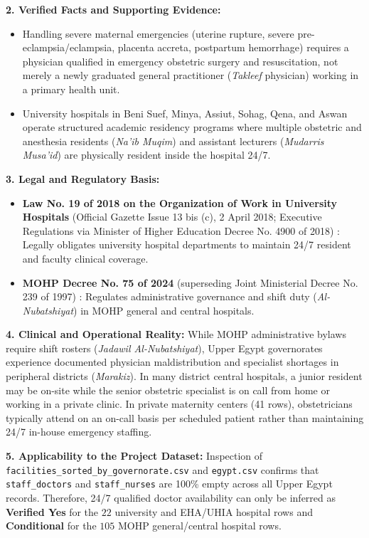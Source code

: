 \documentclass[10pt,a4paper]{article}
\begin{document}
\textbf{2. Verified Facts and Supporting Evidence:}
\begin{itemize}
    \item Handling severe maternal emergencies (uterine rupture, severe pre-eclampsia/eclampsia, placenta accreta, postpartum hemorrhage) requires a physician qualified in emergency obstetric surgery and resuscitation, not merely a newly graduated general practitioner (\textit{Takleef} physician) working in a primary health unit.
    \item University hospitals in Beni Suef, Minya, Assiut, Sohag, Qena, and Aswan operate structured academic residency programs where multiple obstetric and anesthesia residents (\textit{Na'ib Muqim}) and assistant lecturers (\textit{Mudarris Musa'id}) are physically resident inside the hospital 24/7.
\end{itemize}

\textbf{3. Legal and Regulatory Basis:}
\begin{itemize}
    \item \textbf{Law No. 19 of 2018 on the Organization of Work in University Hospitals} (Official Gazette Issue 13 bis (c), 2 April 2018; Executive Regulations via Minister of Higher Education Decree No. 4900 of 2018) \cite{egypt_law_19_2018_univ}: Legally obligates university hospital departments to maintain 24/7 resident and faculty clinical coverage.
    \item \textbf{MOHP Decree No. 75 of 2024} (superseding Joint Ministerial Decree No. 239 of 1997) \cite{egypt_mohp_decree_75_2024}: Regulates administrative governance and shift duty (\textit{Al-Nubatshiyat}) in MOHP general and central hospitals.
\end{itemize}

\textbf{4. Clinical and Operational Reality:}
While MOHP administrative bylaws require shift rosters (\textit{Jadawil Al-Nubatshiyat}), Upper Egypt governorates experience documented physician maldistribution and specialist shortages in peripheral districts (\textit{Marakiz}). In many district central hospitals, a junior resident may be on-site while the senior obstetric specialist is on call from home or working in a private clinic. In private maternity centers (41 rows), obstetricians typically attend on an on-call basis per scheduled patient rather than maintaining 24/7 in-house emergency staffing.

\textbf{5. Applicability to the Project Dataset:}
Inspection of \texttt{facilities\_sorted\_by\_governorate.csv} and \texttt{egypt.csv} confirms that \texttt{staff\_doctors} and \texttt{staff\_nurses} are 100\% empty across all Upper Egypt records. Therefore, 24/7 qualified doctor availability can only be inferred as \textbf{Verified Yes} for the $22$ university and EHA/UHIA hospital rows and \textbf{Conditional} for the $105$ MOHP general/central hospital rows.
\end{document}
